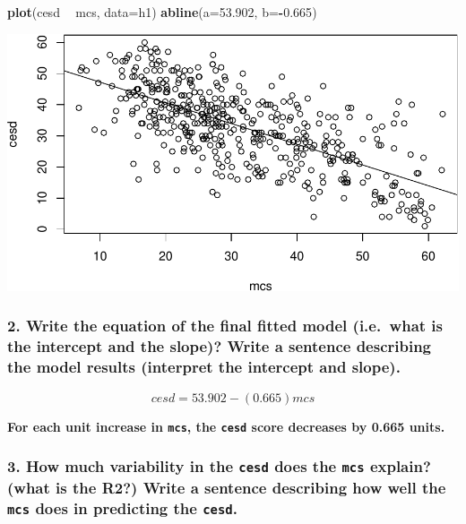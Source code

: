 \documentclass[10pt,letterpaper]{article}
\newenvironment{Shaded}{\begin{snugshade}}{\end{snugshade}}
\newcommand{\KeywordTok}[1]{\textcolor[rgb]{0.13,0.29,0.53}{\textbf{#1}}}
\newcommand{\DataTypeTok}[1]{\textcolor[rgb]{0.13,0.29,0.53}{#1}}
\newcommand{\FloatTok}[1]{\textcolor[rgb]{0.00,0.00,0.81}{#1}}
\newcommand{\StringTok}[1]{\textcolor[rgb]{0.31,0.60,0.02}{#1}}
\newcommand{\OperatorTok}[1]{\textcolor[rgb]{0.81,0.36,0.00}{\textbf{#1}}}
\newcommand{\NormalTok}[1]{#1}
\begin{document}
\begin{Shaded}
\begin{Highlighting}[]
\KeywordTok{plot}\NormalTok{(cesd }\OperatorTok{~}\StringTok{ }\NormalTok{mcs, }\DataTypeTok{data=}\NormalTok{h1)}
\KeywordTok{abline}\NormalTok{(}\DataTypeTok{a=}\FloatTok{53.902}\NormalTok{, }\DataTypeTok{b=}\OperatorTok{-}\FloatTok{0.665}\NormalTok{)}
\end{Highlighting}
\end{Shaded}

\includegraphics{Flynn_HW_06_files/figure-latex/answer 1-1.pdf}

\subsubsection{2. Write the equation of the final fitted model
(i.e.~what is the intercept and the slope)? Write a sentence describing
the model results (interpret the intercept and
slope).}\label{write-the-equation-of-the-final-fitted-model-i.e.what-is-the-intercept-and-the-slope-write-a-sentence-describing-the-model-results-interpret-the-intercept-and-slope.}

\begin{equation}
  cesd = 53.902 - (0.665)mcs
\end{equation}

\textbf{For each unit increase in \texttt{mcs}, the \texttt{cesd} score
decreases by 0.665 units.}

\subsubsection{\texorpdfstring{3. How much variability in the
\texttt{cesd} does the \texttt{mcs} explain? (what is the R2?) Write a
sentence describing how well the \texttt{mcs} does in predicting the
\texttt{cesd}.}{3. How much variability in the cesd does the mcs explain? (what is the R2?) Write a sentence describing how well the mcs does in predicting the cesd.}}\label{how-much-variability-in-the-cesd-does-the-mcs-explain-what-is-the-r2-write-a-sentence-describing-how-well-the-mcs-does-in-predicting-the-cesd.}
\end{document}
